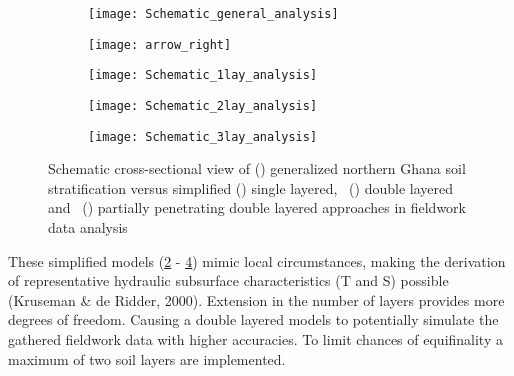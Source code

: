 \begin{figure}[h!]
	\centering
	\begin{subfigure}[b]{0.21\linewidth}
		\centering\texttt{[image: Schematic\_general\_analysis]}
		\captionsetup{justification=centering}		
		\caption{\label{fig:Schematic_general_analysis}}
		\end{subfigure}%
	\begin{subfigure}[b]{0.12\linewidth}
		\centering\texttt{[image: arrow\_right]}
		\end{subfigure}%
	\begin{subfigure}[b]{0.21\linewidth}
		\centering\texttt{[image: Schematic\_1lay\_analysis]}
		\captionsetup{justification=centering}		
		\caption{\label{fig:Schematic_1lay_analysis}}
		\end{subfigure}%
	\begin{subfigure}[b]{0.21\linewidth}
        \centering\texttt{[image: Schematic\_2lay\_analysis]}
		\captionsetup{justification=centering}		
		\caption{\label{fig:Schematic_2lay_analysis}}
		\end{subfigure}
	\begin{subfigure}[b]{0.21\linewidth}
        \centering\texttt{[image: Schematic\_3lay\_analysis]}
		\captionsetup{justification=centering}		
		\caption{\label{fig:Schematic_3lay_analysis}}
		\end{subfigure}
	\captionsetup{justification=centering}	
	\caption{Schematic cross-sectional view of () generalized northern Ghana soil stratification versus simplified () single layered, ~() double layered and ~() partially penetrating double layered approaches in fieldwork data analysis} 
	\label{fig:schematic_fieldwork_analysis}
\end{figure} 

These simplified models (\ref{fig:Schematic_1lay_analysis} - \ref{fig:Schematic_3lay_analysis}) mimic local circumstances, making the derivation of representative hydraulic subsurface characteristics (T and S) possible (Kruseman \& de Ridder, 2000). Extension in the number of layers provides more degrees of freedom. Causing a double layered models to potentially simulate the gathered fieldwork data with higher accuracies. To limit chances of equifinality a maximum of two soil layers are implemented. \\ 


